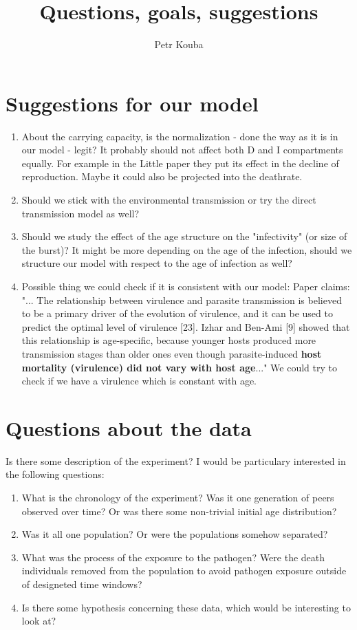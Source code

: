 \documentclass[10pt]{article}         %
\title{Questions, goals, suggestions}
\author{Petr Kouba}
\begin{document}
\maketitle


\section{Suggestions for our model}
\begin{enumerate}
\item About the carrying capacity, is the normalization - done the way as it is in our model - legit? It probably should not affect both D and I compartments equally. For example in the Little paper they put its effect in the decline of reproduction. Maybe it could also be projected into the deathrate.
\item Should we stick with the environmental transmission or try the direct transmission model as well?
\item Should we study the effect of the age structure on the "infectivity" (or size of the burst)? It might be more depending on the age of the infection, should we structure our model with respect to the age of infection as well?
\item Possible thing we could check if it is consistent with our model: Paper \citep{Izhar_Ben_Ami_2} claims: "... The relationship between virulence and parasite transmission is believed to be a primary driver of the evolution of virulence, and it can be used to predict the optimal level of virulence [23]. Izhar and Ben-Ami [9] showed that this relationship is age-specific, because younger hosts produced more transmission stages than older ones even though parasite-induced \textbf{host mortality (virulence) did not vary with host age}..." We could try to check if we have a virulence which is constant with age.
\end{enumerate}

\section{Questions about the data}
Is there some description of the experiment? I would be particulary interested in the following questions:

\begin{enumerate}
\item What is the chronology of the experiment? Was it one generation of peers observed over time? Or was there some non-trivial initial age distribution?
\item Was it all one population? Or were the populations somehow separated?
\item What was the process of the exposure to the pathogen? Were the death individuals removed from the population to avoid pathogen exposure outside of designeted time windows?
\item Is there some hypothesis concerning these data, which would be interesting to look at?
\end{enumerate}
\end{document}
